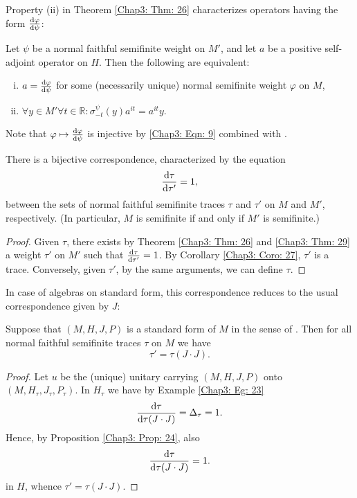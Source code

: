 Property (ii) in Theorem \ref{Chap3: Thm: 26} characterizes operators having the form $\dv{\varphi}{\psi}$:
\begin{theorem}\label{Chap3: Thm: 29}
    Let $\psi$ be a normal faithful semifinite weight on $M'$, and let $a$ be a positive self-adjoint operator on $H$. Then the following are equivalent:
    \begin{enumerate}[(i)]
        \item $a=\dv{\varphi}{\psi}$ for some (necessarily unique) normal semifinite weight $\varphi$ on $M$,
        \item $\forall y\in M'\forall t\in \mathbb{R}:\sigma_{-t}^{\psi}(y)a^{it}=a^{it}y$.
    \end{enumerate}
\end{theorem}
Note that $\varphi\mapsto\dv{\varphi}{\psi}$ is injective by \eqref{Chap3: Eqn: 9} combined with \cite[Proposition 3]{1}.
\begin{corollary}
    There is a bijective correspondence, characterized by the equation
    \begin{equation}\label{Chap3: Eqn: 17}
        \dv{\tau}{\tau'}=1,
    \end{equation}
    between the sets of normal faithful semifinite traces $\tau$ and $\tau'$ on $M$ and $M'$, respectively. (In particular, $M$ is semifinite if and only if $M'$ is semifinite.)
\end{corollary}
\begin{proof}
    Given $\tau$, there exists by Theorem \ref{Chap3: Thm: 26} and \ref{Chap3: Thm: 29} a weight $\tau'$ on $M'$ such that $\dv{\tau}{\tau'}=1$. By Corollary \ref{Chap3: Coro: 27}, $\tau'$ is a trace. Conversely, given $\tau'$, by the same arguments, we can define $\tau$.
\end{proof}
In case of algebras on standard form, this correspondence reduces to the usual correspondence given by $J$:
\begin{corollary}
    Suppose that $(M,H,J,P)$ is a standard form of $M$ in the sense of \cite[Definition 2.1]{4}. Then for all normal faithful semifinite traces $\tau$ on $M$ we have
    \[
        \tau'=\tau(J\cdot J).
    \]
\end{corollary}
\begin{proof}
    Let $u$ be the (unique) unitary carrying $(M,H,J,P)$ onto $(M,H_\tau,J_\tau,P_\tau)$. In $H_\tau$ we have by Example \ref{Chap3: Eg: 23}
    \[
        \dv{\tau}{\tau(J\cdot J)}=\Delta_\tau=1.
    \]
    Hence, by Proposition \ref{Chap3: Prop: 24}, also
    \[
        \dv{\tau}{\tau(J\cdot J)}=1.
    \]
    in $H$, whence $\tau'=\tau(J\cdot J)$.
\end{proof}
